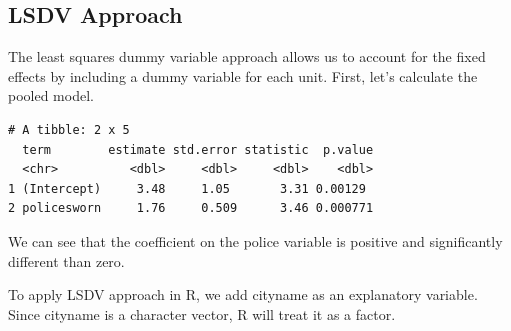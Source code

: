 \documentclass[]{book}
\newenvironment{Shaded}{\begin{snugshade}}{\end{snugshade}}
\newcommand{\DataTypeTok}[1]{\textcolor[rgb]{0.13,0.29,0.53}{#1}}
\newcommand{\DecValTok}[1]{\textcolor[rgb]{0.00,0.00,0.81}{#1}}
\newcommand{\KeywordTok}[1]{\textcolor[rgb]{0.13,0.29,0.53}{\textbf{#1}}}
\newcommand{\NormalTok}[1]{#1}
\newcommand{\OperatorTok}[1]{\textcolor[rgb]{0.81,0.36,0.00}{\textbf{#1}}}
\newcommand{\StringTok}[1]{\textcolor[rgb]{0.31,0.60,0.02}{#1}}
\begin{document}
\hypertarget{lsdv-approach}{%
\subsection{LSDV Approach}\label{lsdv-approach}}

The least squares dummy variable approach allows us to account for the fixed effects by including a dummy variable for each unit. First, let's calculate the pooled model.

\begin{Shaded}
\end{Shaded}

\begin{verbatim}
# A tibble: 2 x 5
  term        estimate std.error statistic  p.value
  <chr>          <dbl>     <dbl>     <dbl>    <dbl>
1 (Intercept)     3.48     1.05       3.31 0.00129 
2 policesworn     1.76     0.509      3.46 0.000771
\end{verbatim}

We can see that the coefficient on the police variable is positive and significantly different than zero.

To apply LSDV approach in R, we add cityname as an explanatory variable. Since cityname is a character vector, R will treat it as a factor.
\end{document}
